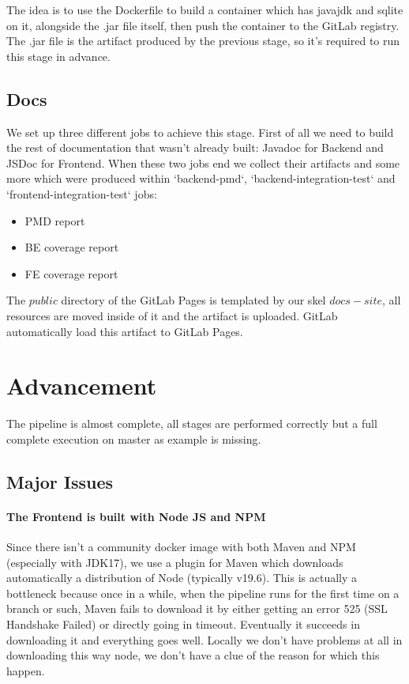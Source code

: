 \documentclass[a4paper,10pt]{scrartcl}
\begin{document}
The idea is to use the Dockerfile to build a container which has javajdk and sqlite on it, alongside the .jar file itself, then push the container to the GitLab registry. The .jar file is the artifact produced by the previous stage, so it's required to run this stage in advance.

\subsection{Docs}

We set up three different jobs to achieve this stage. First of all we need to build the rest of documentation that wasn't already built: Javadoc for Backend and JSDoc for Frontend. When these two jobs end we collect their artifacts and some more which were produced within `backend-pmd`, `backend-integration-test` and `frontend-integration-test` jobs:
\begin{itemize}
    \item PMD report
    \item BE coverage report
    \item FE coverage report
\end{itemize}

The $public$ directory of the GitLab Pages is templated by our skel $docs-site$, all resources are moved inside of it and the artifact is uploaded. GitLab automatically load this artifact to GitLab Pages.

\section{Advancement}

The pipeline is almost complete, all stages are performed correctly but a full complete execution on master as example is missing.

\subsection{Major Issues}

\paragraph{The Frontend is built with Node JS and NPM}

Since there isn't a community docker image with both Maven and NPM (especially with JDK17), we use a plugin for Maven which downloads automatically a distribution of Node (typically v19.6). This is actually a bottleneck because once in a while, when the pipeline runs for the first time on a branch or such, Maven fails to download it by either getting an error 525 (SSL Handshake Failed) or directly going in timeout. Eventually it succeeds in downloading it and everything goes well. Locally we don't have problems at all in downloading this way node, we don't have a clue of the reason for which this happen.
\end{document}
